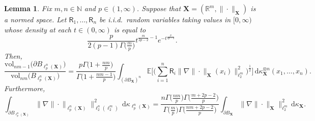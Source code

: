 \documentclass[11pt,reqno]{amsart}
\newcommand{\ud}[0]{\,\mathrm{d}}
\newcommand{\X}{\mathbf X}
\newcommand{\R}{\mathbb R}
\newtheorem{lemma}[theorem]{Lemma}
\theoremstyle{remark}
\newcommand{\E}{\mathbb{ E}}
\newcommand{\N}{\mathbb N}
\newcommand{\vol}{\mathrm{vol}}
\renewcommand{\1}{\mathbf 1}
\newcommand{\RR}{\mathsf{R}}
\begin{document}
\begin{lemma}\label{lem:break surface of ellp(X)} Fix $m,n\in \N$ and $p\in (1,\infty)$. Suppose that $\X=(\R^{m},\|\cdot\|_{\X})$ is a normed space. Let $\RR_1,\ldots,\RR_n$ be i.i.d.~random variables taking values in $[0,\infty)$ whose density at each $t\in (0,\infty)$ is equal to
\begin{equation}\label{eq:R density}
\frac{p}{2(p-1)\Gamma\big(\frac{m}{p}\big)} t^{\frac{m}{2p-2}-1}e^{-t^{\frac{p}{2p-2}}}.
\end{equation}
Then,
\begin{equation}\label{eq:identity surface of ellpnX}
\frac{\vol_{nm-1}\big(\partial B_{\ell_p^n(\X)}\big)}{\vol_{nm}\big(B_{\ell_p^n(\X)}\big)}= \frac{p\Gamma\big(1+\frac{nm}{p}\big)}{\Gamma\big(1+\frac{nm-1}{p}\big)}\int_{(\partial B_{\X})^n}\E \bigg[\Big(\sum_{i=1}^n \mathsf{R}_i \big\|\nabla \|\cdot\|_{\X} (x_i)\big\|_{\ell_2^m}^2\Big)^{\frac12}\bigg]\ud\kappa_{\X}^{\otimes n}(x_1,\ldots,x_n).
\end{equation}
Furthermore,
\begin{equation}\label{eq:quadratic gradient identity}
\int_{\partial B_{\ell_p^n(\X)}} \big\|\nabla \|\cdot\|_{\ell_p^n(\X)}\big\|^2_{\ell_2^n(\ell_2^m)}\ud \kappa_{\ell_p^n(\X)}=\frac{n\Gamma\big(\frac{nm}{p}\big)\Gamma\big(\frac{m+2p-2}{p}\big)}{\Gamma\big(\frac{m}{p}\big)\Gamma\big(\frac{nm+2p-2}{p}\big)}\int_{\partial B_{\X}} \big\|\nabla\|\cdot\|_{\X}\big\|_{\ell_2^m}^2\ud\kappa_{\X}.
\end{equation}
\end{lemma}
\end{document}
